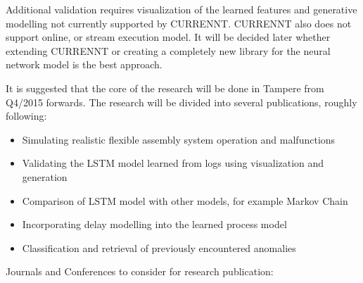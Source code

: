 \documentclass[a4paper,10pt]{article}
\begin{document}
Additional validation requires visualization of the learned features and generative modelling not currently supported by CURRENNT.
CURRENNT also does not support online, or stream execution model. It will be decided later whether extending CURRENNT or creating a completely new library for
the neural network model is the best approach.

It is suggested that the core of the research will be done in Tampere from Q4/2015 forwards.
The research will be divided into several publications, roughly following:
\begin{itemize}
 \item Simulating realistic flexible assembly system operation and malfunctions
 \item Validating the LSTM model learned from logs using visualization and generation
 \item Comparison of LSTM model with other models, for example Markov Chain
 \item Incorporating delay modelling into the learned process model
 \item Classification and retrieval of previously encountered anomalies
\end{itemize}
Journals and Conferences to consider for research publication:
\end{document}
